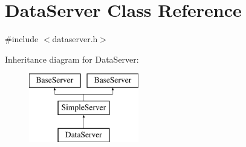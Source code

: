 \hypertarget{classDataServer}{\section{Data\-Server Class Reference}
\label{classDataServer}
}


{\ttfamily \#include $<$dataserver.\-h$>$}

Inheritance diagram for Data\-Server\-:\begin{figure}[H]
\begin{center}
\leavevmode
\includegraphics[height=3.000000cm]{classDataServer}
\end{center}
\end{figure}
